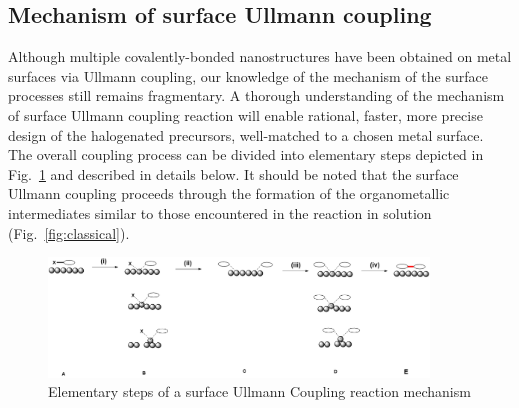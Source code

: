 \documentclass[%
 reprint,
 amsmath,amssymb,
 aps,
prb,
]{revtex4-2}
\begin{document}
\subsection{Mechanism of surface Ullmann coupling}

Although multiple covalently-bonded nanostructures have been obtained on metal surfaces via Ullmann coupling, our knowledge of the mechanism of the surface processes still remains fragmentary. 
A thorough understanding of the mechanism of surface Ullmann coupling reaction will enable rational, faster, more precise design of the halogenated precursors, well-matched to a chosen metal surface.
The overall coupling process can be divided into elementary steps depicted in Fig.~\ref{fig_mecha} and described in details below. It should be noted that the surface Ullmann coupling proceeds through the formation of the organometallic intermediates similar to those encountered in the reaction in solution (Fig.~\ref{fig:classical}).

\begin{figure}[tb]
\centering
\includegraphics[width=0.9\textwidth]{Fig/mechanism.png}
\caption{Elementary steps of a surface Ullmann Coupling reaction mechanism}
\label{fig_mecha}
\end{figure}
\end{document}
